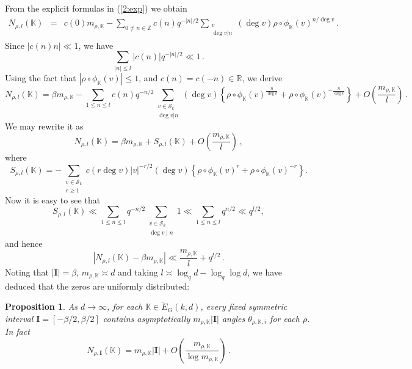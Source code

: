 \documentclass[12pt]{amsart}
\theoremstyle{plain}
\newtheorem{proposition}[thm]{Proposition}
\begin{document}
From the explicit formulas in (\ref{2:exp}) we obtain
\begin{eqnarray*} N_{\rho,l}({{\mathbb K}}) &=& c(0) m_{\rho,{{\mathbb K}}} - \sum_{0 \ne n \in {{\mathbb Z}}}c(n) q^{-|n|/2} \sum_{\substack{v \\ \deg v|n}} (\deg v) \rho \circ {\phi_{{\mathbb K}}}(v)^{n/\deg v} \,.\end{eqnarray*}
Since $|c(n)n| \ll 1$, we have
\[ \sum_{|n| \le l} |c(n)| q^{-|n|/2} \ll 1\,.\]
Using the fact that $\left|\rho \circ {\phi_{{\mathbb K}}}(v)\right| \le 1$, and $c(n) =c(-n) \in {{\mathbb R}}$, we derive
\[N_{\rho,l}({{\mathbb K}})= \beta m_{\rho,{{\mathbb K}}}- \sum_{1 \le n \le l}c(n) q^{-n/2} \sum_{\substack{v \in {\mathcal{S}_k}\\ \deg v|n}} (\deg v) \left\{ \rho \circ {\phi_{{\mathbb K}}}(v)^{\frac{n}{\deg v}}+\rho \circ {\phi_{{\mathbb K}}}(v)^{-\frac{n}{\deg v}}\right\} +O\left(\frac{m_{\rho,{{\mathbb K}}}}{l}\right)\,. \]
We may rewrite it as
\[N_{\rho,l}({{\mathbb K}})= \beta {m_{\rho,{{\mathbb K}}}} +S_{\rho,l}({{\mathbb K}}) +O\left(\frac{m_{\rho,{{\mathbb K}}}}{l}\right)\,, \]
where
\[S_{\rho,l}({{\mathbb K}})=- \sum_{\substack{v \in {\mathcal{S}_k}\\
r \ge 1}}c(r \deg v) |v|^{-r/2} (\deg v) \left\{ \rho \circ {\phi_{{\mathbb K}}}(v)^{r}+\rho \circ {\phi_{{\mathbb K}}}(v)^{-r}\right\}. \]
Now it is easy to see that
\[S_{\rho,l}({{\mathbb K}}) \ll \sum_{1 \le n \le l} q^{-n/2} \sum_{\substack{v \in {\mathcal{S}_k}\\
\deg v \mid n}} 1 \ll \sum_{1 \le n \le l} q^{n/2} \ll q^{l/2},\]
and hence
\[\left|N_{\rho,l}({{\mathbb K}})-\beta {m_{\rho,{{\mathbb K}}}}  \right| \ll \frac{m_{\rho,{{\mathbb K}}}}{l}+q^{l/2}\,.\]
Noting that $|{{\mathbf I}}|=\beta$, ${m_{\rho,{{\mathbb K}}}} \asymp d$ and taking $l \asymp \log_q d-\log_q \log d$, we have deduced that the zeros are uniformly distributed:
\begin{proposition} As $d \to \infty$, for each ${{\mathbb K}} \in \widetilde{E}_G(k,d)$, every fixed symmetric interval ${{\mathbf I}}=[-\beta/2,\beta/2]$ contains asymptotically ${m_{\rho,{{\mathbb K}}}} |{{\mathbf I}}|$ angles $\theta_{\rho,{{\mathbb K}},i}$ for each $\rho$. In fact
\[N_{\rho,{{\mathbf I}}} ({{\mathbb K}})={m_{\rho,{{\mathbb K}}}} |{{\mathbf I}}|+ O\left(\frac{m_{\rho,{{\mathbb K}}}}{\log {m_{\rho,{{\mathbb K}}}}}\right)\,. \]
\end{proposition}
\end{document}
